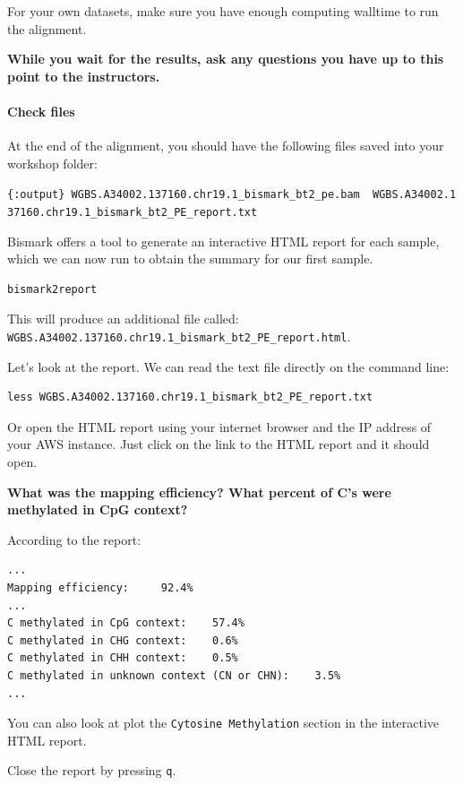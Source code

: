 \documentclass[
]{book}
\begin{document}
For your own datasets, make sure you have enough computing walltime to run the alignment.

\textbf{While you wait for the results, ask any questions you have up to this point to the instructors.}

\paragraph{Check files}\label{check-files}

At the end of the alignment, you should have the following files saved into your workshop folder:

\texttt{\{:output\}\ WGBS.A34002.137160.chr19.1\_bismark\_bt2\_pe.bam\ \ WGBS.A34002.137160.chr19.1\_bismark\_bt2\_PE\_report.txt}

Bismark offers a tool to generate an interactive HTML report for each sample, which we can now run to obtain the summary for our first sample.

\begin{verbatim}
bismark2report
\end{verbatim}

This will produce an additional file called: \texttt{WGBS.A34002.137160.chr19.1\_bismark\_bt2\_PE\_report.html}.

Let's look at the report. We can read the text file directly on the command line:

\begin{verbatim}
less WGBS.A34002.137160.chr19.1_bismark_bt2_PE_report.txt
\end{verbatim}

Or open the HTML report using your internet browser and the IP address of your AWS instance. Just click on the link to the HTML report and it should open.

\textbf{What was the mapping efficiency? What percent of C's were methylated in CpG context? }

According to the report:

\begin{verbatim}
...
Mapping efficiency:     92.4% 
...
C methylated in CpG context:    57.4%
C methylated in CHG context:    0.6%
C methylated in CHH context:    0.5%
C methylated in unknown context (CN or CHN):    3.5%
...
\end{verbatim}

You can also look at plot the \texttt{Cytosine\ Methylation} section in the interactive HTML report.

Close the report by pressing \texttt{q}.
\end{document}
